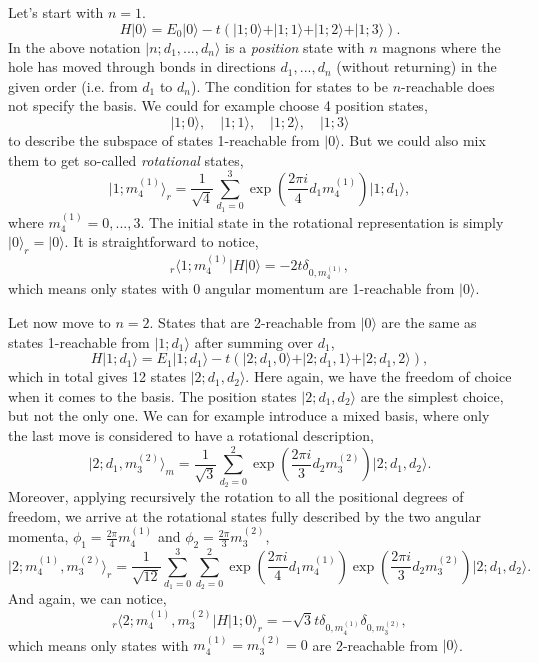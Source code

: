\documentclass[10pt, a4paper, onecolumn]{article}
\newcommand{\ket}[1]{\vert #1 \rangle}
\newcommand{\bra}[1]{\langle #1 \vert}
\begin{document}
Let's start with $n=1$.
\begin{equation}
	H\ket{0} = E_0 \ket{0} - t(\ket{1;0}+\ket{1;1}+\ket{1;2}+\ket{1;3}).
\end{equation}
In the above notation $\ket{n;d_1,...,d_n}$ is a \textit{position} state with $n$ magnons where the hole has moved through bonds in directions $d_1,...,d_n$ (without returning) in the given order (i.e. from $d_1$ to $d_n$). The condition for states to be $n$-reachable does not specify the basis. We could for example choose 4 position states,
\begin{equation}
	\ket{1;0}, \quad \ket{1;1}, \quad \ket{1;2}, \quad \ket{1;3}
\end{equation}
to describe the subspace of states 1-reachable from $\ket{0}$. But we could also mix them to get so-called \textit{rotational} states,
\begin{equation}
	\ket{1;m^{(1)}_4}_r = \frac{1}{\sqrt{4}}\sum_{d_1=0}^3 \exp\left(\frac{2 \pi i}{4}d_1 m^{(1)}_4\right)\ket{1;d_1},
\end{equation}
where $m^{(1)}_4 = 0,...,3$. The initial state in the rotational representation is simply $\ket{0}_r = \ket{0}$. It is straightforward to notice,
\begin{equation}
	_r\bra{1;m^{(1)}_4} H\ket{0} = -2t \delta_{0,m^{(1)}_4},
\end{equation}
which means only states with $0$ angular momentum are 1-reachable from $\ket{0}$. 

Let now move to $n=2$. States that are 2-reachable from $\ket{0}$ are the same as states 1-reachable from $\ket{1;d_1}$ after summing over $d_1$,
\begin{equation}
	H\ket{1;d_1} = E_1 \ket{1;d_1} - t(\ket{2;d_1,0}+\ket{2;d_1,1}+\ket{2;d_1,2}),
\end{equation}
which in total gives 12 states $\ket{2;d_1,d_2}$. Here again, we have the freedom of choice when it comes to the basis. The position states $\ket{2;d_1,d_2}$ are the simplest choice, but not the only one. We can for example introduce a mixed basis, where only the last move is considered to have a rotational description,
\begin{equation}
	\ket{2;d_1,m^{(2)}_3}_m = \frac{1}{\sqrt{3}}\sum_{d_2=0}^2 \exp\left(\frac{2 \pi i}{3}d_2 m^{(2)}_3\right)\ket{2;d_1,d_2}.
\end{equation}
Moreover, applying recursively the rotation to all the positional degrees of freedom, we arrive at the rotational states fully described by the two angular momenta, $\phi_1 = \frac{2\pi}{4}m^{(1)}_4$ and $\phi_2 = \frac{2\pi}{3}m^{(2)}_3$,
\begin{equation}
	\ket{2;m^{(1)}_4,m^{(2)}_3}_r = \frac{1}{\sqrt{12}}\sum_{d_1=0}^3 \sum_{d_2=0}^2 \exp\left(\frac{2 \pi i}{4}d_1 m^{(1)}_4\right) \exp\left(\frac{2 \pi i}{3}d_2 m^{(2)}_3\right)\ket{2;d_1,d_2}.
\end{equation}
And again, we can notice,
\begin{equation}
	_r\bra{2;m^{(1)}_4,m^{(2)}_3}H\ket{1;0}_r = -\sqrt{3}t \delta_{0,m^{(1)}_4} \delta_{0,m^{(2)}_3},
\end{equation}
which means only states with $m^{(1)}_4 = m^{(2)}_3 = 0$ are 2-reachable from $\ket{0}$. 
\end{document}
